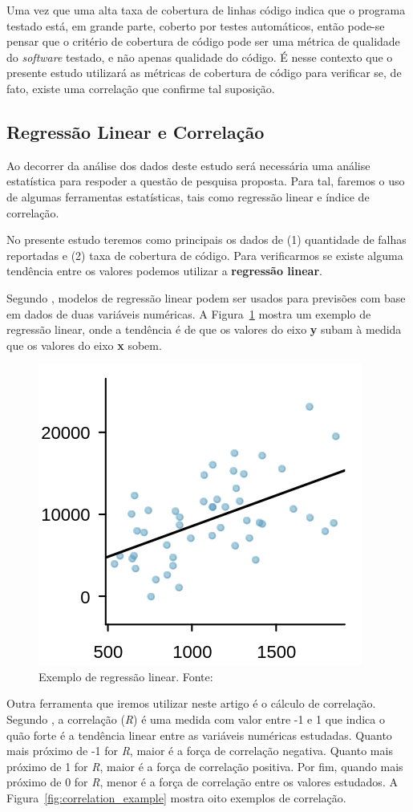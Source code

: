 \documentclass[11.5pt]{article}
\begin{document}
Uma vez que uma alta taxa de cobertura de linhas código indica que o programa testado está, em
grande parte, coberto por testes automáticos, então pode-se pensar que o critério de cobertura de
código pode ser uma métrica de qualidade do \textit{software} testado, e não apenas qualidade do
código.
É nesse contexto que o presente estudo utilizará as métricas de cobertura de código para verificar
se, de fato, existe uma correlação que confirme tal suposição.


\subsection{Regressão Linear e Correlação}

Ao decorrer da análise dos dados deste estudo será necessária uma análise estatística para respoder
a questão de pesquisa proposta.
Para tal, faremos o uso de algumas ferramentas estatísticas, tais como regressão linear e índice de
correlação.

No presente estudo teremos como principais os dados de (1) quantidade de falhas reportadas e (2)
taxa de cobertura de código.
Para verificarmos se existe alguma tendência entre os valores podemos utilizar a
\textbf{regressão linear}.

Segundo \cite{openIntroStat}, modelos de regressão linear podem ser usados para previsões com base
em dados de duas variáveis numéricas. A Figura~\ref{fig:lin_reg_example} mostra um exemplo de
regressão linear, onde a tendência é de que os valores do eixo \textbf{y} subam à medida que os
valores do eixo \textbf{x} sobem.

\begin{figure}[ht]
    \centering
    \includegraphics[width=.3\textwidth]{lin_reg_example.png}
    \caption{Exemplo de regressão linear. Fonte: \cite{openIntroStat}}
    \label{fig:lin_reg_example}
\end{figure}

Outra ferramenta que iremos utilizar neste artigo é o cálculo de correlação.
Segundo \cite{openIntroStat}, a correlação (\textit{R}) é uma medida com valor entre -1 e 1 que
indica o quão forte é a tendência linear entre as variáveis numéricas estudadas.
Quanto mais próximo de -1 for \textit{R}, maior é a força de correlação negativa.
Quanto mais próximo de 1 for \textit{R}, maior é a força de correlação positiva.
Por fim, quando mais próximo de 0 for \textit{R}, menor é a força de correlação entre os valores
estudados. A Figura~\ref{fig:correlation_example} mostra oito exemplos de correlação.
\end{document}
